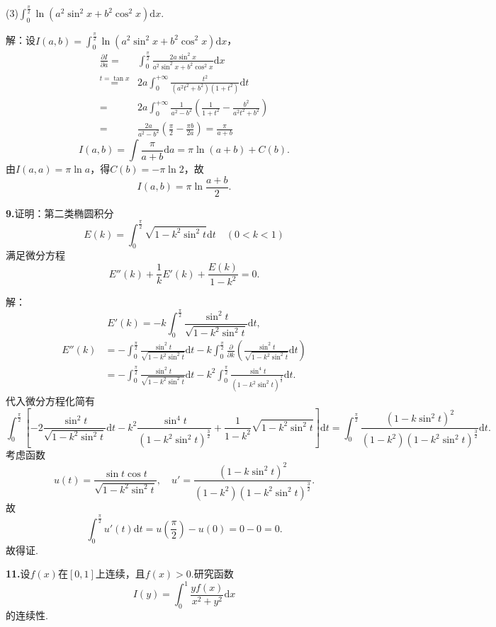 \documentclass[12pt, a4paper]{article}
\newcommand{\dif}{\mathrm{d}}
\begin{document}
(3)\(\int_{0}^{\frac{\pi}{2}} \ln(a^2\sin^2 x + b^2\cos^2 x)\dif x\).

解：设\(I(a, b) = \int_{0}^{\frac{\pi}{2}} \ln(a^2\sin^2 x + b^2\cos^2 x)\dif x\)，
\begin{align*}
\frac{\partial I}{\partial a} = &\int_{0}^{\frac{\pi}{2}} \frac{2a\sin^2 x}{a^2\sin^2 x + b^2\cos^2 x}\dif x \\
\overset{t = \tan x}{=} &2a\int_{0}^{+\infty} \frac{t^2}{(a^2t^2 + b^2)(1 + t^2)}\dif t \\
= &2a\int_{0}^{+\infty} \frac{1}{a^2 - b^2}\left(\frac{1}{1 + t^2} - \frac{b^2}{a^2t^2 + b^2}\right) \\
= &\frac{2a}{a^2 - b^2}\left(\frac{\pi}{2} - \frac{\pi b}{2a}\right) = \frac{\pi}{a + b}
\end{align*}
\[I(a, b) = \int \frac{\pi}{a + b}\dif a = \pi\ln(a + b) + C(b).\]
由\(I(a, a) = \pi\ln a\)，得\(C(b) = -\pi\ln 2\)，故
\[I(a, b) = \pi\ln\frac{a + b}{2}.\]

\textbf{9.}证明：第二类椭圆积分
\[E(k) = \int_{0}^{\frac{\pi}{2}} \sqrt{1 - k^2\sin^2 t}\dif t \quad (0 < k < 1)\]
满足微分方程
\[E''(k) + \frac{1}{k}E'(k) + \frac{E(k)}{1 - k^2} = 0.\]

解：
\[E'(k) = -k\int_{0}^{\frac{\pi}{2}} \frac{\sin^2 t}{\sqrt{1 - k^2\sin^2 t}}\dif t,\]
\begin{align*}
E''(k) &= -\int_{0}^{\frac{\pi}{2}} \frac{\sin^2 t}{\sqrt{1 - k^2\sin^2 t}}\dif t - k\int_{0}^{\frac{\pi}{2}} \frac{\partial}{\partial k} \left(\frac{\sin^2 t}{\sqrt{1 - k^2\sin^2 t}}\dif t\right) \\
&= -\int_{0}^{\frac{\pi}{2}} \frac{\sin^2 t}{\sqrt{1 - k^2\sin^2 t}}\dif t - k^2\int_{0}^{\frac{\pi}{2}} \frac{\sin^4 t}{(1 - k^2\sin^2 t)^{\frac{3}{2}}} \dif t.
\end{align*}
代入微分方程化简有
\[\int_{0}^{\frac{\pi}{2}} \left[-2\frac{\sin^2 t}{\sqrt{1 - k^2\sin^2 t}}\dif t - k^2\frac{\sin^4 t}{(1 - k^2\sin^2 t)^{\frac{3}{2}}} + \frac{1}{1 - k^2}\sqrt{1 - k^2\sin^2 t}\right]\dif t = \int_{0}^{\frac{\pi}{2}}\frac{(1 - k\sin^2 t)^2}{(1 - k^2)(1 - k^2\sin^2 t)^{\frac{3}{2}}}\dif t.\]
考虑函数
\[u(t) = \frac{\sin t\cos t}{\sqrt{1 - k^2\sin^2 t}}, \quad u' = \frac{(1 - k\sin^2 t)^2}{(1 - k^2)(1 - k^2\sin^2 t)^{\frac{3}{2}}}.\]
故
\[\int_{0}^{\frac{\pi}{2}} u'(t)\dif t = u\left(\frac{\pi}{2}\right) - u(0) = 0 - 0 = 0.\]
故得证.

\textbf{11.}设\(f(x)\)在\([0, 1]\)上连续，且\(f(x) > 0\).研究函数
\[I(y) = \int_0^1 \frac{yf(x)}{x^2 + y^2}\dif x\]
的连续性.
\end{document}
